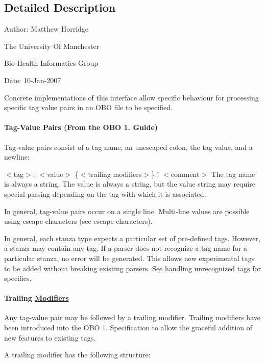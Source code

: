 \subsection{Detailed Description}
Author\-: Matthew Horridge\par
 The University Of Manchester\par
 Bio-\/\-Health Informatics Group\par
 Date\-: 10-\/\-Jan-\/2007\par
\par
 

Concrete implementations of this interface allow specific behaviour for processing specific tag value pairs in an O\-B\-O file to be specified. 

\paragraph*{Tag-\/\-Value Pairs (From the O\-B\-O 1. Guide)}

Tag-\/value pairs consist of a tag name, an unescaped colon, the tag value, and a newline\-: 

$<$tag$>$\-: $<$value$>$ \{$<$trailing modifiers$>$\} ! $<$comment$>$ The tag name is always a string. The value is always a string, but the value string may require special parsing depending on the tag with which it is associated. 

In general, tag-\/value pairs occur on a single line. Multi-\/line values are possible using escape characters (see escape characters). 

In general, each stanza type expects a particular set of pre-\/defined tags. However, a stanza may contain any tag. If a parser does not recognize a tag name for a particular stanza, no error will be generated. This allows new experimental tags to be added without breaking existing parsers. See handling unrecognized tags for specifics. 

\paragraph*{Trailing \hyperlink{classorg_1_1coode_1_1owlapi_1_1obo_1_1parser_1_1_modifiers}{Modifiers}}

Any tag-\/value pair may be followed by a trailing modifier. Trailing modifiers have been introduced into the O\-B\-O 1. Specification to allow the graceful addition of new features to existing tags. 

A trailing modifier has the following structure\-: 

